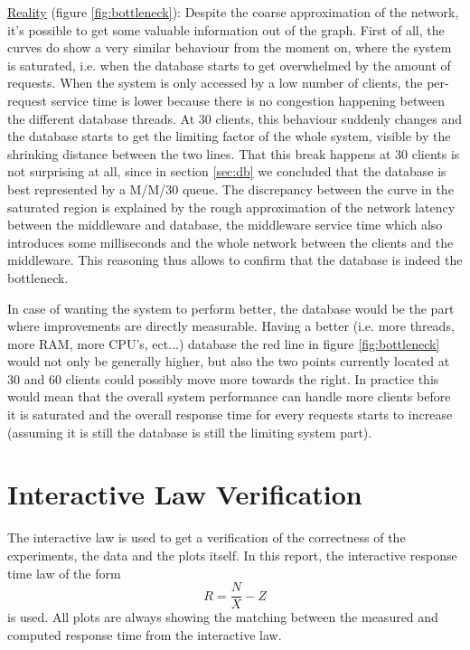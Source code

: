 \documentclass[11pt]{article}
\begin{document}
\newline\underline{Reality} (figure \ref{fig:bottleneck}): Despite the coarse approximation of the network, it's possible to get some valuable information out of the graph. First of all, the curves do show a very similar behaviour from the moment on, where the system is saturated, i.e. when the database starts to get overwhelmed by the amount of requests. When the system is only accessed by a low number of clients, the per-request service time is lower because there is no congestion happening between the different database threads. At 30 clients, this behaviour suddenly changes and the database starts to get the limiting factor of the whole system, visible by the shrinking distance between the two lines. That this break happens at 30 clients is not surprising at all, since in section \ref{sec:db} we concluded that the database is best represented by a M/M/30 queue. The discrepancy between the curve in the saturated region is explained by the rough approximation of the network latency between the middleware and database, the middleware service time which also introduces some milliseconds and the whole network between the clients and the middleware. This reasoning thus allows to confirm that the database is indeed the bottleneck.

In case of wanting the system to perform better, the database would be the part where improvements are directly measurable. Having a better (i.e. more threads, more RAM, more CPU's, ect...) database the red line in figure \ref{fig:bottleneck} would not only be generally higher, but also the two points currently located at 30 and 60 clients could possibly move more towards the right. In practice this would mean that the overall system performance can handle more clients before it is saturated and the overall response time for every requests starts to increase (assuming it is still the database is still the limiting system part).

\section{Interactive Law Verification}\label{sec:interactive-law}

The interactive law is used to get a verification of the correctness of the experiments, the data and the plots itself. In this report, the interactive response time law of the form
\begin{equation*}
	R=\frac{N}{X}-Z
\end{equation*}
is used. All plots are always showing the matching between the measured and computed response time from the interactive law.
\end{document}
